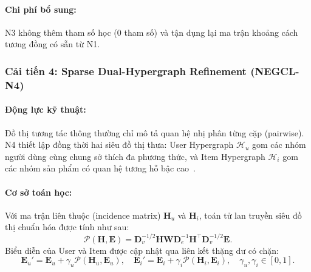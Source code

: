 \paragraph{Chi phí bổ sung:}
N3 không thêm tham số học ($0$ tham số) và tận dụng lại ma trận khoảng cách tương đồng có sẵn từ N1.

\subsubsection{Cải tiến 4: Sparse Dual-Hypergraph Refinement (NEGCL-N4)}

\paragraph{Động lực kỹ thuật:}
Đồ thị tương tác thông thường chỉ mô tả quan hệ nhị phân từng cặp (pairwise). N4 thiết lập đồng thời hai siêu đồ thị thưa: User Hypergraph $\mathcal{H}_u$ gom các nhóm người dùng cùng chung sở thích đa phương thức, và Item Hypergraph $\mathcal{H}_i$ gom các nhóm sản phẩm có quan hệ tương hỗ bậc cao~\cite{guo2025mmhcl}.

\paragraph{Cơ sở toán học:}
Với ma trận liên thuộc (incidence matrix) $\mathbf{H}_u$ và $\mathbf{H}_i$, toán tử lan truyền siêu đồ thị chuẩn hóa được tính như sau:
\begin{equation}
\mathcal{P}(\mathbf{H}, \mathbf{E}) = \mathbf{D}_v^{-1/2} \mathbf{H} \mathbf{W} \mathbf{D}_e^{-1} \mathbf{H}^\top \mathbf{D}_v^{-1/2} \mathbf{E}.
\label{eq:n4_hyper_prop}
\end{equation}
Biểu diễn của User và Item được cập nhật qua liên kết thặng dư có chặn:
\begin{equation}
\mathbf{E}_u' = \mathbf{E}_u + \gamma_u \mathcal{P}(\mathbf{H}_u, \mathbf{E}_u), \quad
\mathbf{E}_i' = \mathbf{E}_i + \gamma_i \mathcal{P}(\mathbf{H}_i, \mathbf{E}_i), \quad \gamma_u, \gamma_i \in [0, 1].
\label{eq:n4_hyper_residual}
\end{equation}

